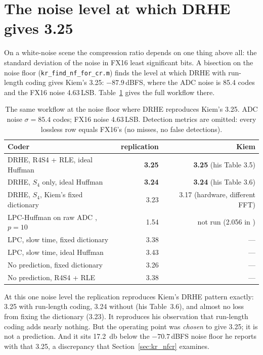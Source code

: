 \section{The noise level at which DRHE gives 3.25}
\label{sec:kr_m88}

On a white-noise scene the compression ratio depends on one thing above all:
the standard deviation of the noise in FX16 least significant bits. A bisection
on the noise floor (\texttt{kr\_find\_nf\_for\_cr.m}) finds the level at which
DRHE with run-length coding gives Kiem's 3.25: $-87.9$\,dBFS, where the ADC
noise is 85.4 codes and the FX16 noise \num{4.63}\,LSB.
Table~\ref{tab:kr_m88} gives the full workflow there.

\begin{table}[htbp]
\centering
\caption[Replication at $-87.9$\,dBFS]{The same workflow at the noise floor
where DRHE reproduces Kiem's 3.25. ADC noise $\sigma = 85.4$ codes; FX16 noise
\num{4.63}\,LSB. Detection metrics are omitted: every lossless row equals
FX16's (no misses, no false detections).}
\label{tab:kr_m88}
\small
\begin{tabular}{@{}lrr@{}}
\toprule
Coder & replication & Kiem\\
\midrule
DRHE, R4S4 + RLE, ideal Huffman     & \textbf{3.25} & \textbf{3.25} (his Table 3.5)\\
DRHE, $S_4$ only, ideal Huffman     & \textbf{3.24} & \textbf{3.24} (his Table 3.6)\\
DRHE, $S_4$, Kiem's fixed dictionary & 3.23 & 3.17 (hardware, different FFT)\\
LPC-Huffman on raw ADC \cite{meucci2022}, $p=10$ & 1.54 & not run (2.056 in \cite{meucci2022})\\
LPC, slow time, fixed dictionary    & 3.38 & ---\\
LPC, slow time, ideal Huffman       & 3.43 & ---\\
No prediction, fixed dictionary     & 3.26 & ---\\
No prediction, R4S4 + RLE           & 3.38 & ---\\
\bottomrule
\end{tabular}
\end{table}

\noindent
At this one noise level the replication reproduces Kiem's DRHE pattern
exactly: 3.25 with run-length coding, 3.24 without (his Table~3.6), and almost
no loss from fixing the dictionary (3.23). It reproduces his observation that
run-length coding adds nearly nothing. But the operating point was
\emph{chosen} to give 3.25; it is not a prediction. And it sits
\SI{17.2}{\decibel} below the $-70.7$\,dBFS noise floor he reports with that
3.25, a discrepancy that Section~\ref{sec:kr_nfcr} examines.

